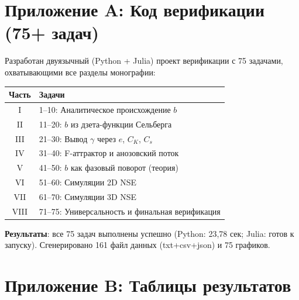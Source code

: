 \documentclass[11pt,a4paper,twoside]{article}
\theoremstyle{remark}
\begin{document}
\section{Приложение A: Код верификации (75+ задач)}
\label{sec:code}

Разработан двуязычный (Python + Julia) проект верификации с 75 задачами, охватывающими все разделы монографии:

\begin{center}
\begin{tabular}{cl}
\toprule
Часть & Задачи \\
\midrule
I & 1--10: Аналитическое происхождение $b$ \\
II & 11--20: $b$ из дзета-функции Сельберга \\
III & 21--30: Вывод $\gamma$ через $e$, $C_K$, $C_s$ \\
IV & 31--40: F-аттрактор и анозовский поток \\
V & 41--50: $b$ как фазовый поворот (теория) \\
VI & 51--60: Симуляции 2D NSE \\
VII & 61--70: Симуляции 3D NSE \\
VIII & 71--75: Универсальность и финальная верификация \\
\bottomrule
\end{tabular}
\end{center}

\textbf{Результаты}: все 75 задач выполнены успешно (Python: 23{,}78 сек; Julia: готов к запуску). Сгенерировано 161 файл данных (txt+csv+json) и 75 графиков.

\section{Приложение B: Таблицы результатов}
\label{sec:tables}
\end{document}
